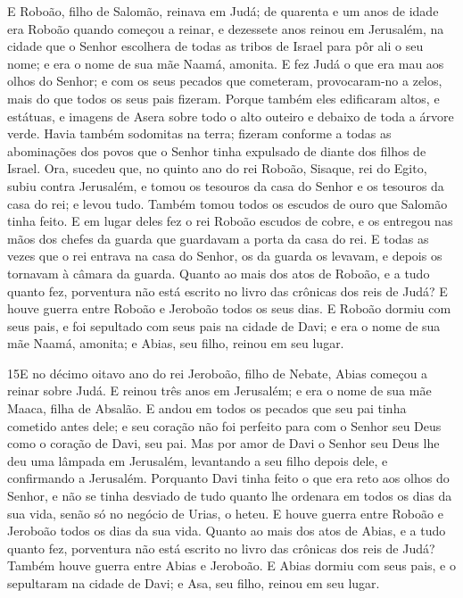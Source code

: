 E Roboão, filho de Salomão, reinava em Judá; de quarenta e um
anos de idade era Roboão quando começou a reinar, e dezessete anos
reinou em Jerusalém, na cidade que o Senhor escolhera de todas as
tribos de Israel para pôr ali o seu nome; e era o nome de sua mãe
Naamá, amonita. E fez Judá o que era mau aos olhos do Senhor;
e com os seus pecados que cometeram, provocaram-no a zelos, mais do
que todos os seus pais fizeram. Porque também eles edificaram
altos, e estátuas, e imagens de Asera sobre todo o alto outeiro e
debaixo de toda a árvore verde.
 Havia também sodomitas na terra; fizeram conforme a todas as
abominações dos povos que o Senhor tinha expulsado de diante dos
filhos de Israel. Ora, sucedeu que, no quinto ano do rei
Roboão, Sisaque, rei do Egito, subiu contra Jerusalém, e
tomou os tesouros da casa do Senhor e os tesouros da casa do rei; e
levou tudo. Também tomou todos os escudos de ouro que Salomão tinha
feito. E em lugar deles fez o rei Roboão escudos de cobre, e
os entregou nas mãos dos chefes da guarda que guardavam a porta da
casa do rei. E todas as vezes que o rei entrava na casa do
Senhor, os da guarda os levavam, e depois os tornavam à câmara da
guarda. Quanto ao mais dos atos de Roboão, e a tudo quanto
fez, porventura não está escrito no livro das crônicas dos reis de
Judá? E houve guerra entre Roboão e Jeroboão todos os seus
dias. E Roboão dormiu com seus pais, e foi sepultado com seus
pais na cidade de Davi; e era o nome de sua mãe Naamá, amonita; e
Abias, seu filho, reinou em seu lugar.

\medskip

\lettrine{15} E no décimo oitavo ano do rei Jeroboão, filho de
Nebate, Abias começou a reinar sobre Judá. E reinou três anos em
Jerusalém; e era o nome de sua mãe Maaca, filha de Absalão. E
andou em todos os pecados que seu pai tinha cometido antes dele; e
seu coração não foi perfeito para com o Senhor seu Deus como o
coração de Davi, seu pai. Mas por amor de Davi o Senhor seu Deus
lhe deu uma lâmpada em Jerusalém, levantando a seu filho depois
dele, e confirmando a Jerusalém. Porquanto Davi tinha feito o
que era reto aos olhos do Senhor, e não se tinha desviado de tudo
quanto lhe ordenara em todos os dias da sua vida, senão só no
negócio de Urias, o heteu. E houve guerra entre Roboão e
Jeroboão todos os dias da sua vida. Quanto ao mais dos atos de
Abias, e a tudo quanto fez, porventura não está escrito no livro das
crônicas dos reis de Judá? Também houve guerra entre Abias e
Jeroboão. E Abias dormiu com seus pais, e o sepultaram na cidade
de Davi; e Asa, seu filho, reinou em seu lugar.

